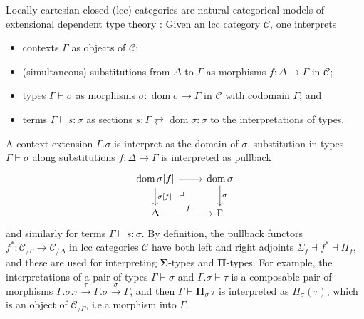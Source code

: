 \documentclass[a4paper]{article}
\theoremstyle{remark}
\theoremstyle{definition}
\begin{document}
Locally cartesian closed (lcc) categories are natural categorical models of extensional dependent type theory \cite{lcc-categories-and-type-theory}:
Given an lcc category $\mathcal{C}$, one interprets
\begin{itemize}
  \item
    contexts $\Gamma$ as objects of $\mathcal{C}$;
  \item
    (simultaneous) substitutions from $\Delta$ to $\Gamma$ as morphisms $f : \Delta \rightarrow \Gamma$ in $\mathcal{C}$;
  \item
    types $\Gamma \vdash \sigma$ as morphisms $\sigma : \operatorname{dom} \sigma \rightarrow \Gamma$ in $\mathcal{C}$ with codomain $\Gamma$; and
  \item
    terms $\Gamma \vdash s : \sigma$ as sections $s : \Gamma \rightleftarrows \operatorname{dom} \sigma : \sigma$ to the interpretations of types.
\end{itemize}
A context extension $\Gamma.\sigma$ is interpret as the domain of $\sigma$, substitution in types $\Gamma \vdash \sigma$ along substitutions $f : \Delta \rightarrow \Gamma$ is interpreted as pullback
\begin{equation}
  \begin{tikzcd}
    \operatorname{dom} \sigma[f] \arrow[r] \arrow[d, "{\sigma[f]}"] \arrow[dr, phantom, near start, "\lrcorner"] & \operatorname{dom} \sigma \arrow[d, "\sigma"] \\
    \Delta \arrow[r, "f"] & \Gamma
  \end{tikzcd}
\end{equation}
and similarly for terms $\Gamma \vdash s : \sigma$.
By definition, the pullback functors $f^* : \mathcal{C}_{/ \Gamma} \rightarrow \mathcal{C}_{/ \Delta}$ in lcc categories $\mathcal{C}$ have both left and right adjoints $\Sigma_f \dashv f^* \dashv \Pi_f$, and these are used for interpreting $\mathbf{\Sigma}$-types and $\mathbf{\Pi}$-types.
For example, the interpretations of a pair of types $\Gamma \vdash \sigma$ and $\Gamma.\sigma \vdash \tau$ is a composable pair of morphisms $\Gamma.\sigma.\tau \xrightarrow{\tau} \Gamma.\sigma \xrightarrow{\sigma} \Gamma$, and then $\Gamma \vdash \mathbf{\Pi}_\sigma \, \tau$ is interpreted as $\Pi_\sigma(\tau)$, which is an object of $\mathcal{C}_{/ \Gamma}$, i.e.\@ a morphism into $\Gamma$.
\end{document}
